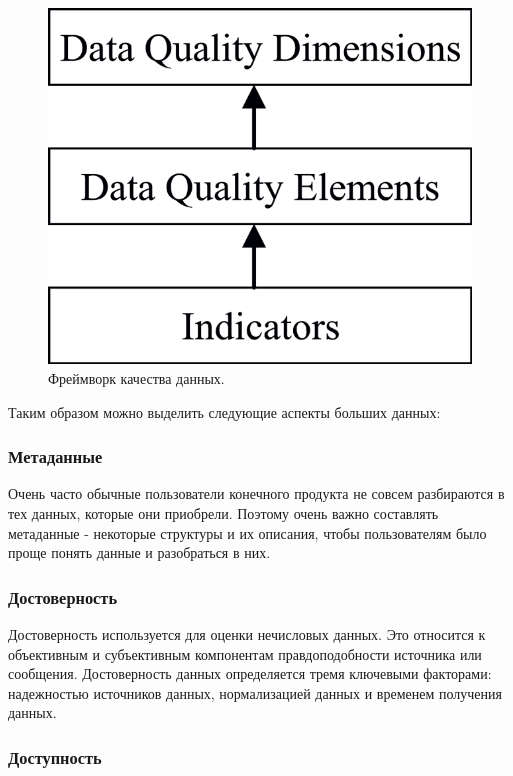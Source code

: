 \documentclass{article}
\begin{document}
\begin{figure}[H]
    \centering
    \includegraphics[scale=0.3]{big_data_quality.png}
    \caption{Фреймворк качества данных.}
    \label{fig:my_label}
\end{figure}

Таким образом можно выделить следующие аспекты больших данных:

\subsubsection{Метаданные}

Очень часто обычные пользователи конечного продукта не совсем разбираются в тех данных, которые они приобрели. Поэтому очень важно составлять метаданные - некоторые структуры и их описания, чтобы пользователям было проще понять данные и разобраться в них.

\subsubsection{Достоверность}

Достоверность используется для оценки нечисловых данных. Это относится к объективным и субъективным компонентам правдоподобности источника или сообщения. Достоверность данных определяется тремя ключевыми факторами: надежностью источников данных, нормализацией данных и временем получения данных.

\subsubsection{Доступность}
\end{document}
